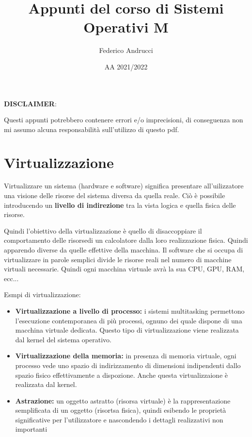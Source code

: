 \documentclass{article}
\title{Appunti del corso di Sistemi Operativi M}
\author{Federico Andrucci}
\date{AA 2021/2022}
\begin{document}
\maketitle

\vfill
\begin{center}
\textbf{DISCLAIMER}: 

Questi appunti potrebbero contenere errori e/o imprecisioni, di conseguenza non mi assumo alcuna responsabilità sull'utilizzo di questo pdf.
\end{center}

\newpage

\tableofcontents

\newpage

\section{Virtualizzazione}

Virtualizzare un sistema (hardware e software) significa presentare all'uilizzatore una visione delle risorse del sistema diversa da quella reale.
Ciò è possibile introducendo un \textbf{livello di indirezione} tra la vista logica e quella fisica delle risorse.

Quindi l'obiettivo della virtualizzazione è quello di disaccoppiare il comportamento delle risorsedi un calcolatore dalla loro realizzazione fisica. 
Quindi apparendo diverse da quelle effettive della macchina. Il software che si occupa di virtualizzare in parole semplici divide le risorse reali nel numero di macchine virtuali necessarie. 
Quindi ogni macchina virtuale avrà la sua CPU, GPU, RAM, ecc...

Esmpi di virtualizzazione:
\begin{itemize}
    \item \textbf{Virtualizzazione a livello di processo:} i sistemi multitasking permettono l'esecuzione contemporanea di più processi, ognuno dei quale dispone 
    di una macchina virtuale dedicata. Questo tipo di virtualizzazione viene realizzata dal kernel del sistema operativo.
    \item \textbf{Virtualizzazione della memoria:} in presenza di memoria virtuale, ogni processo vede uno spazio di indirizzamento di dimensioni indipendenti dallo spazio fisico effettivamente a dispozione. Anche questa virtualizzaione è realizzata dal kernel.
    \item \textbf{Astrazione:} un oggetto astratto (risorsa virtuale) è la rappresentazione semplificata di un oggetto (risortsa fisica), quindi esibendo le 
    proprietà significative per l'utilizzatore e nascondendo i dettagli realizzativi non importanti
\end{itemize}
\end{document}
